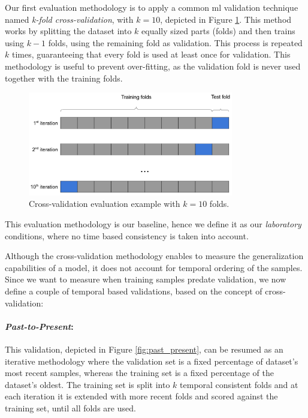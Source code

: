 Our first evaluation methodology is to apply a common \gls{ml} validation technique named \textit{k-fold cross-validation}, with $k=10$, depicted in Figure \ref{fig:xval}.
This method works by splitting the dataset into $k$ equally sized parts (folds) and then trains using $k-1$ folds, using the remaining fold as validation.
This process is repeated $k$ times, guaranteeing that every fold is used at least once for validation.
This methodology is useful to prevent over-fitting, as the validation fold is never used together with the training folds.

\begin{figure}[!htb]
	\centering
	\includegraphics[width=0.8\textwidth]{Figures/dia_xvalidation.png}
	\caption[Cross-validation evaluation example.]{Cross-validation evaluation example with $k=10$ folds.}
	\label{fig:xval}
\end{figure}

This evaluation methodology is our baseline, hence we define it as our \textit{laboratory} conditions, where no time based consistency is taken into account.

\medskip

Although the cross-validation methodology enables to measure the generalization capabilities of a model, it does not account for temporal ordering of the samples.
Since we want to measure when training samples predate validation, we now define a couple of temporal based validations, based on the concept of cross-validation:

\paragraph{\textit{Past-to-Present}:} This validation, depicted in Figure \ref{fig:past_present}, can be resumed as an iterative methodology where the validation set is a fixed percentage of dataset's most recent samples, whereas the training set is a fixed percentage of the dataset's oldest.
The training set is split into $k$ temporal consistent folds and at each iteration it is extended with more recent folds and scored against the training set, until all folds are used.

